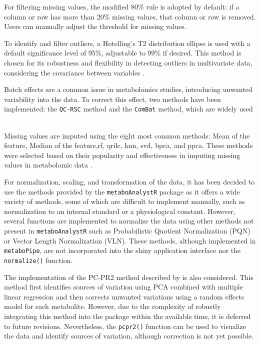 \documentclass[ENG, BIB]{TFUOC}%
\begin{document}
For filtering missing values, the modified 80\% rule is adopted by default: if a column or row has more than 20\% missing values, that column or row is removed. Users can manually adjust the threshold for missing values.

To identify and filter outliers, a Hotelling's T2 distribution ellipse is used with a default significance level of 95\%, adjustable to 99\% if desired. This method is chosen for its robustness and flexibility in detecting outliers in multivariate data, considering the covariance between variables \cite{wuUsingNontargetedLCMS2021, viallonNewPipelineNormalization2021}.

Batch effects are a common issue in metabolomics studies, introducing unwanted variability into the data. To correct this effect, two methods have been implemented: the \texttt{QC-RSC} method and the \texttt{ComBat} method, which are widely used \


Missing values are imputed using the eight most common methods: Mean of the feature, Median of the feature,\gls{rf}, \gls{qrilc}, \gls{knn}, \gls{svd}, \gls{bpca}, and \gls{ppca}. These methods were selected based on their popularity and effectiveness in imputing missing values in metabolomic data \cite{weiMissingValueImputation2018,sunPretreatingNormalizingMetabolomics2024}.

For normalization, scaling, and transformation of the data, it has been decided to use the methods provided by the \texttt{metaboAnalystR} package as it offers a wide variety of methods, some of which are difficult to implement manually, such as normalization to an internal standard or a physiological constant. However, several functions are implemented to normalize the data using other methods not present in \texttt{metaboAnalystR} such as Probabilistic Quotient Normalization (PQN) or Vector Length Normalization (VLN). These methods, although implemented in \texttt{metaboPipe}, are not incorporated into the shiny application interface nor the \texttt{normalize()} function.

The implementation of the PC-PR2 method described by \citeauthor{viallonNewPipelineNormalization2021} is also considered. This method first identifies sources of variation using PCA combined with multiple linear regression and then corrects unwanted variations using a random effects model for each metabolite. However, due to the complexity of robustly integrating this method into the package within the available time, it is deferred to future revisions. Nevertheless, the \texttt{pcpr2()} function can be used to visualize the data and identify sources of variation, although correction is not yet possible.
\end{document}
